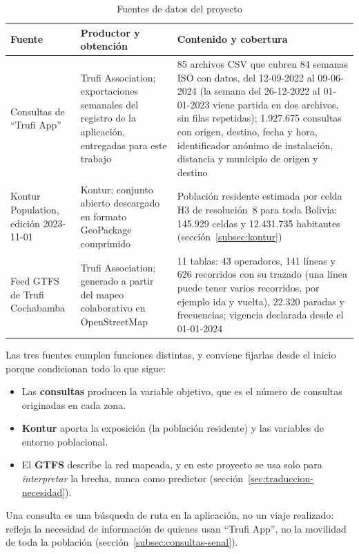 \begin{table}[H]
  \centering
  \caption{Fuentes de datos del proyecto}
  \label{tab:fuentes-datos}
  \interlineadoSimple
  \small
  \begin{tabularx}{\textwidth}{@{}L{0.20\textwidth}L{0.22\textwidth}Y@{}}
    \toprule
    \textbf{Fuente} & \textbf{Productor y obtención} & \textbf{Contenido y cobertura} \\
    \midrule
    Consultas de ``Trufi App'' & Trufi Association; exportaciones semanales del registro de la aplicación, entregadas para este trabajo & 85 archivos CSV que cubren 84 semanas ISO con datos, del 12-09-2022 al 09-06-2024 (la semana del 26-12-2022 al 01-01-2023 viene partida en dos archivos, sin filas repetidas); 1.927.675 consultas con origen, destino, fecha y hora, identificador anónimo de instalación, distancia y municipio de origen y destino \\
    Kontur Population, edición 2023-11-01 & Kontur; conjunto abierto descargado en formato GeoPackage comprimido & Población residente estimada por celda H3 de resolución~8 para toda Bolivia: 145.929 celdas y 12.431.735 habitantes (sección~\ref{subsec:kontur}) \\
    Feed GTFS de Trufi Cochabamba & Trufi Association; generado a partir del mapeo colaborativo en OpenStreetMap & 11 tablas: 43 operadores, 141 líneas y 626 recorridos con su trazado (una línea puede tener varios recorridos, por ejemplo ida y vuelta), 22.320 paradas y frecuencias; vigencia declarada desde el 01-01-2024 \\
    \bottomrule
  \end{tabularx}
\end{table}

Las tres fuentes cumplen funciones distintas, y conviene fijarlas desde el inicio porque
condicionan todo lo que sigue:
\begin{itemize}
  \item Las \textbf{consultas} producen la variable objetivo, que es el número de consultas
        originadas en cada zona.
  \item \textbf{Kontur} aporta la exposición (la población residente) y las variables de
        entorno poblacional.
  \item El \textbf{GTFS} describe la red mapeada, y en este proyecto se usa solo para
        \emph{interpretar} la brecha, nunca como predictor (sección~\ref{sec:traduccion-necesidad}).
\end{itemize}
Una consulta es una búsqueda de ruta en la aplicación, no un viaje realizado: refleja la
necesidad de información de quienes usan ``Trufi App'', no la movilidad de toda la población
(sección~\ref{subsec:consultas-senal}).

